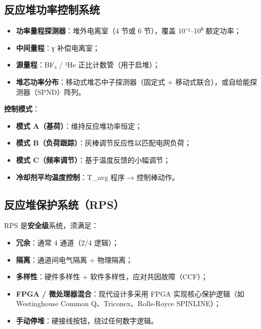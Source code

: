 \documentclass[
  UTF8,
  scheme=plain,
  fontsize=10pt,
  openany
]{ctexbook}
\begin{document}
\subsection{反应堆功率控制系统}\label{ux53cdux5e94ux5806ux529fux7387ux63a7ux5236ux7cfbux7edf}

\begin{itemize}
\tightlist
\item
  \textbf{功率量程探测器}：堆外电离室（4 节或 6 节），覆盖 10⁻³--10⁰
  额定功率；
\item
  \textbf{中间量程}：γ 补偿电离室；
\item
  \textbf{源量程}：BF₃ / ³He 正比计数管（用于启堆）；
\item
  \textbf{堆芯功率分布}：移动式堆芯中子探测器（固定式 +
  移动式联合），或自给能探测器（SPND）阵列。
\end{itemize}

\textbf{控制模式}：

\begin{itemize}
\tightlist
\item
  \textbf{模式 A（基荷）}：维持反应堆功率恒定；
\item
  \textbf{模式 B（负荷跟踪）}：灰棒调节反应性以匹配电网负荷；
\item
  \textbf{模式 C（频率调节）}：基于温度反馈的小幅调节；
\item
  \textbf{冷却剂平均温度控制}：T\_avg 程序 → 控制棒动作。
\end{itemize}

\subsection{反应堆保护系统（RPS）}\label{ux53cdux5e94ux5806ux4fddux62a4ux7cfbux7edfrps}

RPS 是\textbf{安全级}系统，须满足：

\begin{itemize}
\tightlist
\item
  \textbf{冗余}：通常 4 通道（2/4 逻辑）；
\item
  \textbf{隔离}：通道间电气隔离 + 物理隔离；
\item
  \textbf{多样性}：硬件多样性 + 软件多样性，应对共因故障（CCF）；
\item
  \textbf{FPGA / 微处理器混合}：现代设计多采用 FPGA 实现核心保护逻辑（如
  Westinghouse Common Q、Triconex、Rolls-Royce SPINLINE）；
\item
  \textbf{手动停堆}：硬接线按钮，绕过任何数字逻辑。
\end{itemize}
\end{document}
